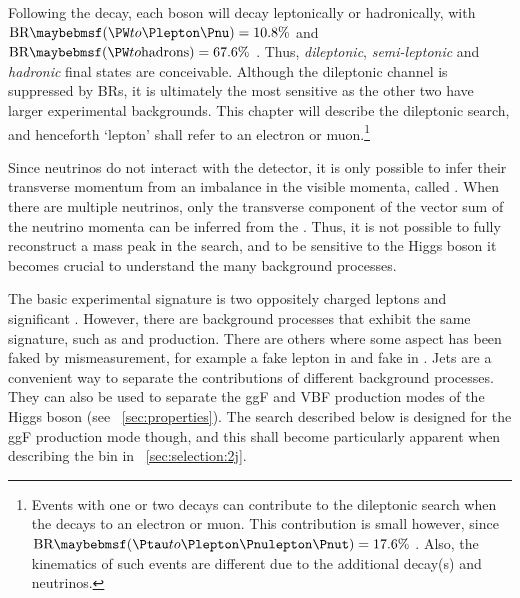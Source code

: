 
Following the \HWW decay, each \PW boson will decay leptonically or hadronically, with 
$\text{BR}\parenths{\HepProcess{\PW\HepTo\Plepton\Pnu}} = 10.8\%$ and 
$\text{BR}\parenths{\HepProcess{\PW\HepTo \text{hadrons}}} = 67.6\%$ \cite{PDG:2012}. 
Thus, \textit{dileptonic}, \textit{semi-leptonic} and \textit{hadronic} final states are 
conceivable. Although the dileptonic channel is suppressed by \acp{BR}, it is ultimately 
the most sensitive as the other two have larger experimental backgrounds. This chapter 
will describe the dileptonic search, and henceforth 
`lepton' shall refer to an electron or muon.\footnote{
	Events with one or two \HepProcess{\PW\HepTo\Ptau\Pnu} decays can 
	contribute to the dileptonic search when the \Ptau decays to an electron or muon. This 
	contribution is small however, since
	$\text{BR}\parenths{\HepProcess{\Ptau\HepTo\Plepton\Pnulepton\Pnut}} = 17.6\%$ 
	\cite{PDG:2012}. Also, the kinematics of such events are different due to the 
	additional decay(s) and neutrinos.
}

Since neutrinos do not interact with the detector, it is only possible to infer their 
transverse momentum from an imbalance in the visible momenta, called \met. When there are 
multiple neutrinos, only the transverse component of the vector sum of the neutrino 
momenta can be inferred from the \met. Thus, it is not possible to fully reconstruct a 
mass peak in the \HWWlvlv search, and to be sensitive to the Higgs boson it becomes 
crucial to understand the many background processes.

The basic experimental signature is two oppositely charged leptons and significant \met. 
However, there are background processes that exhibit the same signature, such as \WW and 
\ttbar production. There are others where some aspect has been faked by mismeasurement, 
for example a 
fake lepton in \Wjets and fake \met in \Zjets. Jets are a convenient way to separate the 
contributions of different background processes. They can also be used to separate the 
\ac{ggF} and \ac{VBF} production modes of the Higgs boson (see 
\Section~\ref{sec:properties}). The search described below is designed for the \ac{ggF} 
production mode though, and this shall become particularly apparent when describing the 
\twojet bin in \Section~\ref{sec:selection:2j}.
